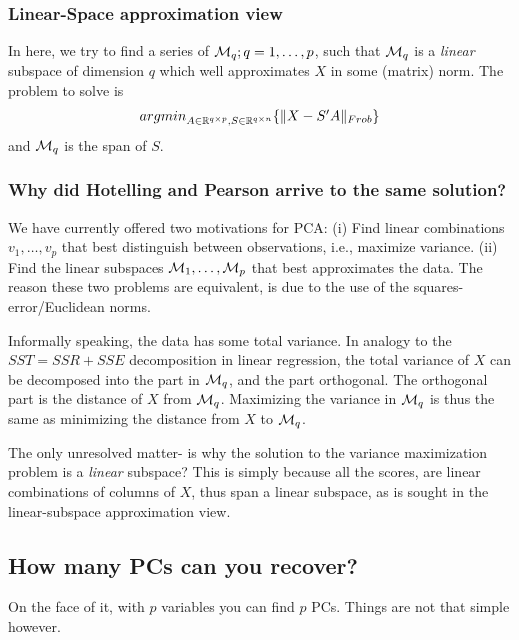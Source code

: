 \documentclass[12pt,a4paper]{article}
\begin{document}
\subsubsection{Linear-Space approximation view}

In here, we try to find a series of $\mathcal{M}_q; q=1,\dots,p$, such that $\mathcal{M}_q$ is a \emph{linear} subspace of dimension $q$ which well approximates $X$ in some (matrix) norm. 
The problem to solve is 
\begin{align}
\label{eq:pca-dim-reduce}
	\textstyle{\mathop{argmin}_{A\in \mathbb{R}^{q \times p}, S\in \mathbb{R}^{q \times n}}}\{ \Vert X- S'A \Vert_{Frob} \}
\end{align}
and $\mathcal{M}_q$ is the span of $S$.




\subsubsection{Why did Hotelling and Pearson arrive to the same solution?}
\label{sec:pca_intuition}

We have currently offered two motivations for PCA: 
(i) Find linear combinations $v_1,\dots,v_p$ that best distinguish between observations, i.e., maximize variance. 
(ii) Find the linear subspaces $\mathcal{M}_1,\dots,\mathcal{M}_p$ that best approximates the data.
The reason these two problems are equivalent, is due to the use of the squares-error/Euclidean norms.

Informally speaking, the data has some total variance. 
In analogy to the $SST=SSR+SSE$ decomposition in linear regression, the total variance of $X$ can be decomposed into the part in $\mathcal{M}_q$, and the part orthogonal. 
The orthogonal part is the distance of $X$ from $\mathcal{M}_q$. 
Maximizing the variance in $\mathcal{M}_q$ is thus the same as minimizing the distance from $X$ to $\mathcal{M}_q$. 

The only unresolved matter- is why the solution to the variance maximization problem is a \emph{linear} subspace?
This is simply because all the scores, are linear combinations of columns of $X$, thus span a linear subspace, as is sought in the linear-subspace approximation view. 


\subsection{How many PCs can you recover?}
\label{sec:how-many-pcs}
On the face of it, with $p$ variables you can find $p$ PCs. 
Things are not that simple however.
\end{document}
